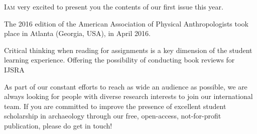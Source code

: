 \def\IJSRAidentifier{\currfilebase} %
\def\shorttitle{Issue Presentation}
\def\maintitle{Presentation of the First Issue of IJSRA in 2017}
\def\cmail{gonzalo.linaresmatas@st-hughs.ox.ac.uk}
\def\authorone{Gonzalo Linares Matás}
\def\bioone{\authorone is a third-year undergraduate student reading the BA Archaeology \& Anthropology at St~Hugh’s College, University of Oxford (UK). 
He was the former President of the Oxford University Archaeology Society (Michaelmas 2015), and he has recently been invited to join the WAC (World Archaeology Congress) Student Committee. 
He is particularly interested in the socio-political contexts of heritage management and ownership, contemporary archaeological theory, and the histories of the academic disciplines of archaeology and anthropology as practical modes of inquiry. 
He is doing his undergraduate dissertation on the socio-economic dimensions of early bone technology, focusing on the late Early Pleistocene assemblage at the site of Cueva Negra del Estrecho del Río Quípar (Murcia, Spain). 
He is also very interested in transforming the academic publishing landscape.}
\def\affilone{Executive Editor, International Journal of Student Research in Archaeology
\\St. Hugh’s College, University of Oxford}


\IJSRAopening%
\lettrine{I}{am} very excited to present you the contents of our first issue this year.

The 2016 edition of the American Association of Physical Anthropologists took place in Atlanta (Georgia, USA), in April 2016. 


Critical thinking when reading for assignments is a key dimension of the student learning experience. Offering the possibility of conducting book reviews for IJSRA 

\IJSRAseparator
As part of our constant efforts to reach as wide an audience as possible, we are always looking for people with diverse research interests to join our international team. If you are committed to improve the presence of excellent student scholarship in archaeology through our free, open-access, not-for-profit publication, please do get in touch!

\IJSRAclosing%